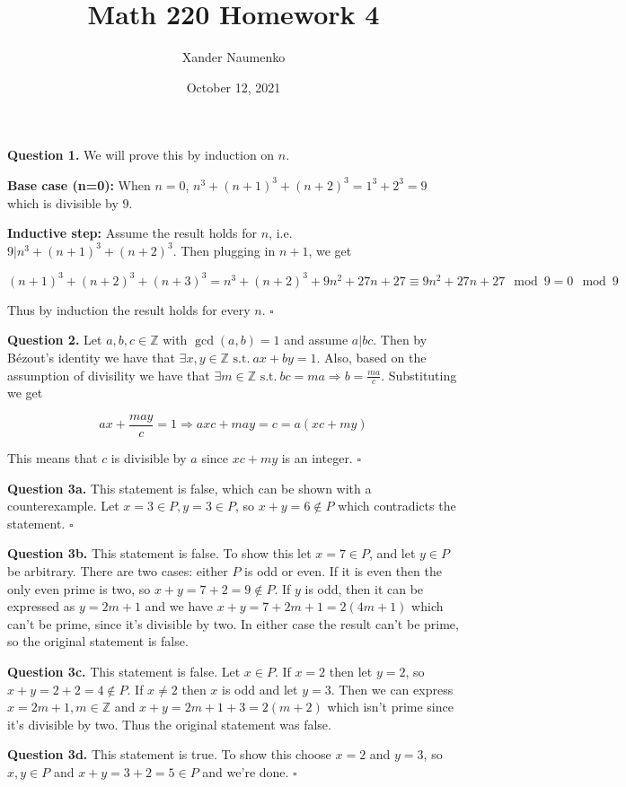 \documentclass[letterpaper, reqno,11pt]{article}
\newcommand{\ZZ}{\mathbb{Z}}
\newcommand{\st}{\text{ s.t.}\ }
\begin{document}
\title{Math 220 Homework 4}
\date{October 12, 2021}
\author{Xander Naumenko}
\maketitle

{\noindent\bf Question 1.} We will prove this by induction on $n$. 

{\bf Base case (n=0):} When $n=0$, $n^3+(n+1)^3+(n+2)^3=1^3+2^3=9$ which is divisible by $9$. 

{\bf Inductive step:} Assume the result holds for $n$, i.e. $9|n^3+(n+1)^3+(n+2)^3$. Then plugging in $n+1$, we get 

$$
    (n+1)^3+(n+2)^3+(n+3)^3=n^3+(n+2)^3+9n^2+27n+27\equiv 9n^2+27n+27\mod9=0\mod9
$$

Thus by induction the result holds for every $n$. $\square$ 

{\noindent\bf Question 2.} Let $a, b, c\in\ZZ$ with $\gcd(a, b)=1$ and assume $a|bc$. Then by B\'ezout's identity we have that $\exists x, y\in\ZZ\st ax+by=1$. Also, based on the assumption of divisility we have that $\exists m\in\ZZ\st bc=ma\Rightarrow b=\frac{ma}{c}$. Substituting we get 

$$
    ax+\frac{may}{c}=1\Rightarrow axc+may=c=a(xc+my)
$$

This means that $c$ is divisible by $a$ since $xc+my$ is an integer. $\square$

{\noindent\bf Question 3a.} This statement is false, which can be shown with a counterexample. Let $x=3\in P, y=3\in P$, so $x+y=6\notin P$ which contradicts the statement. $\square$

{\noindent\bf Question 3b.} This statement is false. To show this let $x=7\in P$, and let $y\in P$ be arbitrary. There are two cases: either $P$ is odd or even. If it is even then the only even prime is two, so $x+y=7+2=9\notin P$. If $y$ is odd, then it can be expressed as $y=2m+1$ and we have $x+y=7+2m+1=2(4m+1)$ which can't be prime, since it's divisible by two. In either case the result can't be prime, so the original statement is false. 

{\noindent\bf Question 3c.} This statement is false. Let $x\in P$. If $x=2$ then let $y=2$, so $x+y=2+2=4\notin P$. If $x\neq 2$ then $x$ is odd and let $y=3$. Then we can express $x=2m+1, m\in\ZZ$ and $x+y=2m+1+3=2(m+2)$ which isn't prime since it's divisible by two. Thus the original statement was false. 

{\noindent\bf Question 3d.} This statement is true. To show this choose $x=2$ and $y=3$, so $x, y\in P$ and $x+y=3+2=5\in P$ and we're done. $\square$
\end{document}
